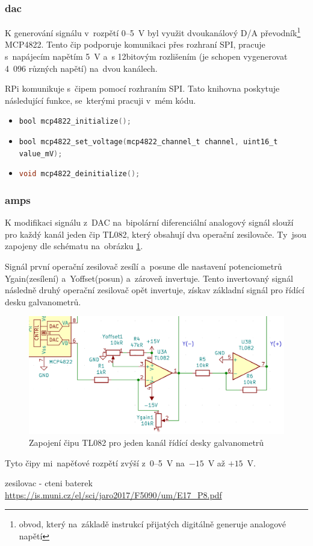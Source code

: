 \subsubsection{dac\cite{mcp4822-dsh}}
K generování signálu v~rozpětí 0--5~V byl využit dvoukanálový D/A převodník\footnote{obvod, který na~základě instrukcí přijatých digitálně generuje analogové napětí} MCP4822.
Tento čip podporuje komunikaci přes rozhraní SPI, pracuje s~napájecím napětím 5~V a~s 12bitovým rozlišením (je schopen vygenerovat 4~096 různých napětí) na~dvou kanálech.

RPi komunikuje s~čipem pomocí rozhraním SPI.
Tato knihovna poskytuje následující funkce, se~kterými pracuji v~mém kódu.
\begin{itemize}
\item
\lstinline[language=C]!bool mcp4822_initialize();!
\item
\lstinline[language=C]!bool mcp4822_set_voltage(mcp4822_channel_t channel, uint16_t value_mV);!
\item
\lstinline[language=C]!void mcp4822_deinitialize();!
\end{itemize}
\subsubsection{amps\cite{tl082-dsh}}
K modifikaci signálu z~DAC na~bipolární diferenciální analogový signál slouží pro každý kanál jeden čip TL082, který obsahují dva operační zesilovače. Ty~jsou zapojeny dle schématu na~obrázku \ref{fig:ilda_amps-scheme}.

Signál první operační zesilovač zesílí a~posune dle nastavení potenciometrů Ygain(zesílení) a~Yoffset(posun) a~zároveň invertuje. Tento invertovaný signál následně druhý operační zesilovač opět invertuje, získav základní signál pro řídící desku galvanometrů.

\begin{figure}[!htb]
  \centering
  \includegraphics[width=1\textwidth]{img/ilda_amps.png} 
  \caption{\label{fig:ilda_amps-scheme} Zapojení čipu TL082 pro jeden kanál řídící desky galvanometrů}
\end{figure}

Tyto čipy mi~napěťové rozpětí zvýší z~0--5~V na~$-15$~V až $+15$~V.

zesilovac - cteni baterek \url{https://is.muni.cz/el/sci/jaro2017/F5090/um/E17_P8.pdf}

